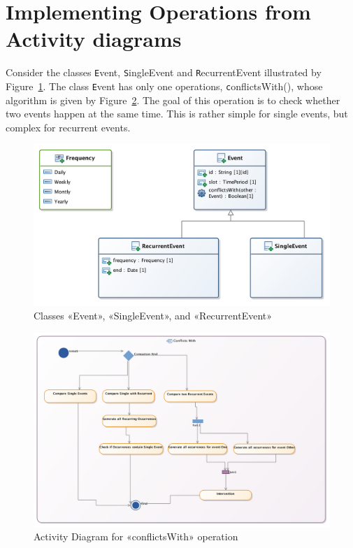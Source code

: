 \documentclass[a4paper,11pt]{memoir}
\newcommand{\code}[1]{{\texttt #1}}
\begin{document}
\begin{solution}
			
\end{solution}

\newpage
\section{Implementing Operations from Activity diagrams}

Consider the classes \code{Event}, \code{SingleEvent} and \code{RecurrentEvent} illustrated by Figure~\ref{fig:recurrent}.
The class \code{Event} has only one operations, \code{conflictsWith()}, whose algorithm is given by Figure~\ref{fig:conflicts}.
The goal of this operation is to check whether two events happen at the same time. 
This is rather simple for single events, but complex for recurrent events.


\begin{figure}[htbp]
	\centering
		\includegraphics[width=.8\linewidth]{cd-recurrent-event.png}
	\caption{Classes «Event», «SingleEvent», and «RecurrentEvent»}
	\label{fig:recurrent}
\end{figure}


\begin{figure}[htbp]
	\centering
		\includegraphics[width=\linewidth]{ad-conflicts.png}
	\caption{Activity Diagram for «conflictsWith» operation}
	\label{fig:conflicts}
\end{figure}
\end{document}
